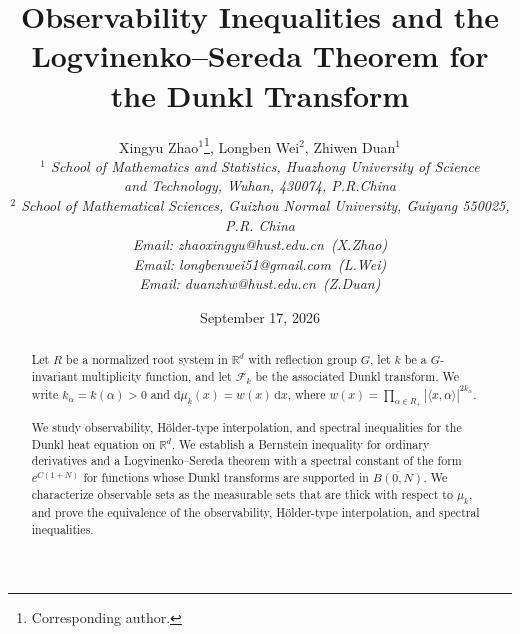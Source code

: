 \documentclass[12pt]{article}
\begin{document}
\renewcommand{\a}{\alpha}
\newcommand{\D}{\Delta}
\newcommand{\ddt}{\frac{\mathrm{d}}{\mathrm{d}t}}
\newcommand{\e}{\epsilon}
\newcommand{\eps}{\varepsilon}
\newtheorem{theorem}{Theorem}[section]
\newtheorem{proposition}{Proposition}[section]
\newtheorem{lemma}[theorem]{Lemma}
\newtheorem{remark}[theorem]{Remark}
\newtheorem{example}{Example}[section]
\newtheorem{definition}{Definition}[section]
\newtheorem{corollary}[theorem]{Corollary}
\makeatletter
\newcommand{\rmnum}[1]{\romannumeral #1}
\newcommand{\Rmnum}[1]{\expandafter\@slowromancap\romannumeral #1@}
\makeatother

\title{Observability Inequalities and the Logvinenko--Sereda Theorem for the Dunkl Transform}
\author{Xingyu Zhao$^{1}$\footnote{Corresponding author.}, Longben Wei$^{2}$, Zhiwen Duan$^{1}$ \\
			{\small {\it $^{1}$ School of Mathematics and Statistics, Huazhong University of Science }}\\
			{\small {\it and Technology, Wuhan, {\rm 430074,} P.R.China}}  \\
			{\small {\it $^{2}$ School of Mathematical Sciences, Guizhou Normal University, Guiyang 550025, P.R. China}}\\
			{\small {\it Email: zhaoxingyu@hust.edu.cn~(X.Zhao)}}\\
			{\small {\it Email: longbenwei51@gmail.com~(L.Wei)}}\\
			{\small {\it Email: duanzhw@hust.edu.cn~(Z.Duan)}}}

\date{September 17, 2026}
\maketitle

\begin{abstract} 
Let $R$ be a normalized root system in $\mathbb{R}^d$ with reflection group $G$, let $k$ be a $G$-invariant multiplicity function, and let $\mathcal{F}_k$ be the associated Dunkl transform. We write $k_\alpha=k(\alpha)>0$ and $\mathrm{d}\mu_k(x)=w(x)\,\mathrm{d}x$, where $w(x)=\prod_{\alpha\in R_+}|\langle x,\alpha\rangle|^{2k_\alpha}$.
 
We study observability, H\"older-type interpolation, and spectral inequalities for the Dunkl heat equation on $\mathbb{R}^d$. We establish a Bernstein inequality for ordinary derivatives and a Logvinenko--Sereda theorem with a spectral constant of the form $e^{C(1+N)}$ for functions whose Dunkl transforms are supported in $\overline{B(0,N)}$. We characterize observable sets as the measurable sets that are thick with respect to $\mu_k$, and prove the equivalence of the observability, H\"older-type interpolation, and spectral inequalities.
\end{abstract}
\end{document}
